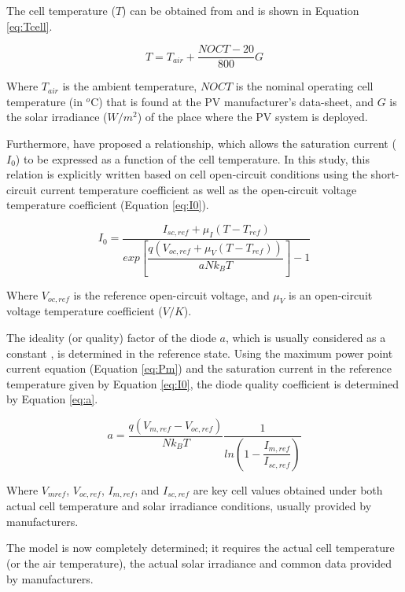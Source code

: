 \documentclass[journal]{IEEEtran}
\begin{document}
The cell temperature ($ T $) can be obtained from \cite{Ross} and is shown in Equation \ref{eq:Tcell}.

\begin{equation}
\label{eq:Tcell}
T = T_{air} + \dfrac{NOCT-20}{800}G
\end{equation}

Where $ T_{air} $ is the ambient temperature, $NOCT$ is the nominal operating cell temperature (in $^{o}$C) that is found at the PV manufacturer's data-sheet, and $G$ is the solar irradiance ($ W/m^{2} $) of the place where the PV system is deployed.

Furthermore, \cite{Villalva} have proposed a relationship, which allows the saturation current ($ I_{0} $) to be expressed as a function of the cell temperature. In this study, this relation is explicitly written based on cell open-circuit conditions using the short-circuit current temperature coefficient as well as the open-circuit voltage temperature coefficient (Equation \ref{eq:I0}).

\begin{equation}
\label{eq:I0}
I_{0} = \dfrac{I_{sc,ref} + \mu_{I}(T - T_{ref})}{exp \left[ \dfrac{q(V_{oc,ref} + \mu_{V} (T - T_{ref}))}{aNk_{B}T}    \right] -1}
\end{equation}

Where $ V_{oc,ref} $ is the reference open-circuit voltage, and $ \mu_{V} $ is an open-circuit voltage temperature coefficient ($ V/K $).

The ideality (or quality) factor of the diode $ a $, which is usually considered as a constant \cite{Villalva}, is determined in the reference state. Using the maximum power point current equation (Equation \ref{eq:Pm}) and the saturation current in the reference temperature given by Equation \ref{eq:I0}, the diode quality coefficient is determined by Equation \ref{eq:a}.

\begin{equation}
\label{eq:a}
a = \dfrac{q(V_{m,ref}-V_{oc,ref})}{Nk_{B}T} \dfrac{1}{ln \left( 1 - \dfrac{I_{m,ref}}{I_{sc,ref}}  \right) }
\end{equation}

Where $ V_{mref} $, $ V_{oc,ref} $, $ I_{m,ref} $, and $ I_{sc,ref} $ are key cell values obtained under both actual cell temperature and solar irradiance conditions, usually provided by manufacturers.

The model is now completely determined; it requires the actual cell temperature (or the air temperature), the actual solar irradiance and common data provided by manufacturers.
\end{document}
